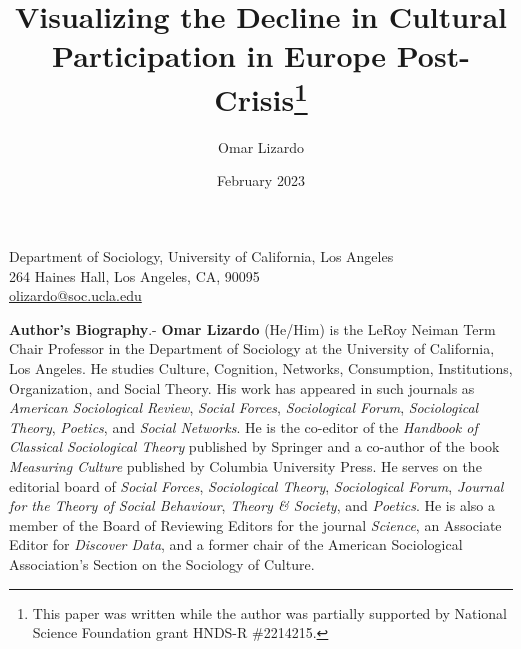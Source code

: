 \documentclass{article}
\title{Visualizing the Decline in Cultural Participation in Europe Post-Crisis\footnote{This paper was written while the author was partially supported by National Science Foundation grant HNDS-R \#2214215.}}
\author{Omar Lizardo}
\date{February 2023}
\begin{document}
\maketitle
\begin{center}
Department of Sociology, University of California, Los Angeles \\
264 Haines Hall, Los Angeles, CA, 90095 \\
\href{mailto:olizardo@soc.ucla.edu}{olizardo@soc.ucla.edu} \\

\end{center}

{\bf Author's Biography}.- {\bf Omar Lizardo} (He/Him) is the LeRoy Neiman Term Chair Professor in the Department of Sociology at the University of California, Los Angeles. He studies Culture, Cognition, Networks, Consumption, Institutions, Organization, and Social Theory. His work has appeared in such journals as \textit{American Sociological Review}, \textit{Social Forces}, \textit{Sociological Forum}, \textit{Sociological Theory}, \textit{Poetics}, and \textit{Social Networks}. He is the co-editor of the \textit{Handbook of Classical Sociological Theory} published by Springer and a co-author of the book \textit{Measuring Culture} published by Columbia University Press. He serves on the editorial board of \textit{Social Forces}, \textit{Sociological Theory}, \textit{Sociological Forum}, \textit{Journal for the Theory of Social Behaviour}, \textit{Theory \& Society}, and \textit{Poetics}. He is also a member of the Board of Reviewing Editors for the journal \textit{Science}, an Associate Editor for \textit{Discover Data}, and a former chair of the American Sociological Association's Section on the Sociology of Culture. 
\end{document}
